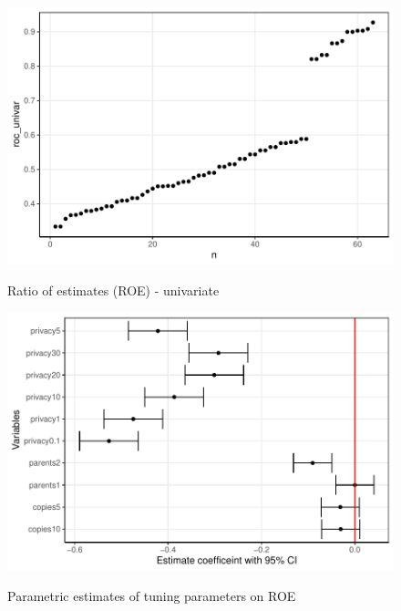 \documentclass[12pt]{article}
\begin{document}
\begin{figure}[!h]
    \centering
    \caption{Ratio of estimates (ROE) - univariate}
    \includegraphics{../graphs/datasynthesizer/graph_datasynthesizer_roc_univar_raw.pdf}
    \label{graph_datasynthesizer_roc_univar_raw}
\end{figure}

\begin{figure}[!h]
    \centering
    \caption{Parametric estimates of tuning parameters on ROE}
    \includegraphics{../graphs/datasynthesizer/graph_datasynthesizer_roc_univar.pdf}
    \label{graph_datasynthesizer_roc_univar}
\end{figure}
\end{document}
